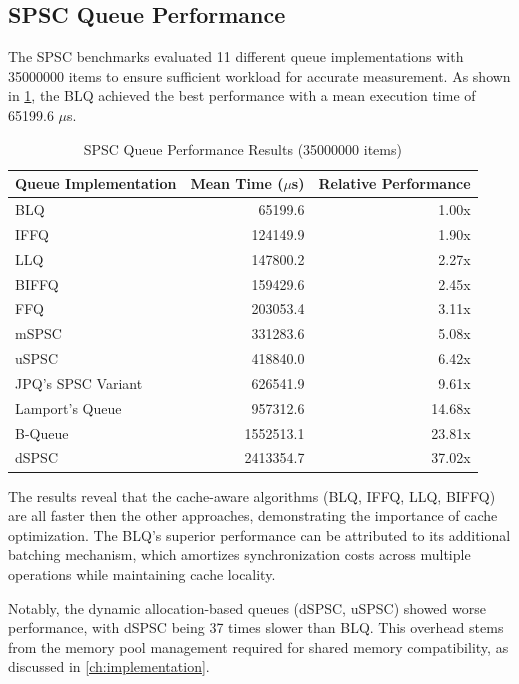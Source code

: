\subsection{\acf{SPSC} Queue Performance}
The \ac{SPSC} benchmarks evaluated 11 different queue implementations with 35000000 items to ensure sufficient workload for accurate measurement. As shown in \cref{tab:spsc-results}, the \ac{BLQ} achieved the best performance with a mean execution time of 65199.6 $\mu$s.

\begin{table}[htb]
\centering
\caption{\ac{SPSC} Queue Performance Results (35000000 items)}
\label{tab:spsc-results}
\begin{tabular}{@{}lrr@{}}
\toprule
Queue Implementation & Mean Time ($\mu$s) & Relative Performance \\
\midrule
\ac{BLQ} & 65199.6 & 1.00x \\
\ac{IFFQ} & 124149.9 & 1.90x \\
\ac{LLQ} & 147800.2 & 2.27x \\
\ac{BIFFQ} & 159429.6 & 2.45x \\
\ac{FFQ} & 203053.4 & 3.11x \\
\ac{mSPSC} & 331283.6 & 5.08x \\
\ac{uSPSC} & 418840.0 & 6.42x \\
\ac{JPQ}'s \ac{SPSC} Variant & 626541.9 & 9.61x \\
Lamport's Queue & 957312.6 & 14.68x \\
B-Queue & 1552513.1 & 23.81x \\
\ac{dSPSC} & 2413354.7 & 37.02x \\
\bottomrule
\end{tabular}
\end{table}

The results reveal that the cache-aware algorithms (\ac{BLQ}, \ac{IFFQ}, \ac{LLQ}, \ac{BIFFQ}) are all faster then the other approaches, demonstrating the importance of cache optimization. The \ac{BLQ}'s superior performance can be attributed to its additional batching mechanism, which amortizes synchronization costs across multiple operations while maintaining cache locality.

Notably, the dynamic allocation-based queues (\ac{dSPSC}, \ac{uSPSC}) showed worse performance, with \ac{dSPSC} being 37 times slower than \ac{BLQ}. This overhead stems from the memory pool management required for shared memory compatibility, as discussed in \cref{ch:implementation}.

